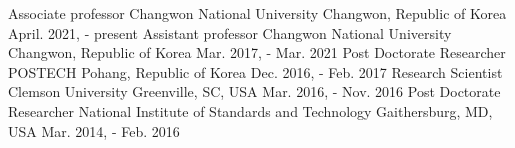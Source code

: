 

\begin{cventries}
  \cventry
  {Associate professor} %
  {Changwon National University}
  {Changwon, Republic of Korea} %
  {April. 2021, - present} %
  {
  }
  \cventry
  {Assistant professor} %
  {Changwon National University}
  {Changwon, Republic of Korea} %
  {Mar. 2017, - Mar. 2021} %
  {
  }
  \cventry
  {Post Doctorate Researcher} %
  {POSTECH}
  {Pohang, Republic of Korea} %
  {Dec. 2016, - Feb. 2017} %
  {
  }
  \cventry
  {Research Scientist} %
  {Clemson University}
  {Greenville, SC, USA} %
  {Mar. 2016, - Nov. 2016} %
  {
  }
  \cventry
  {Post Doctorate Researcher} %
  {National Institute of Standards and Technology} %
  {Gaithersburg, MD, USA} %
  {Mar. 2014, - Feb. 2016} %
  {
}
\end{cventries}
